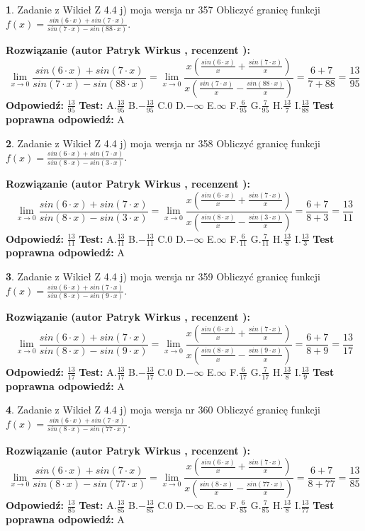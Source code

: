 \documentclass[12pt, a4paper]{article}
\theoremstyle{definition} %
\newtheorem{zad}{}
\newcommand{\zadStart}[1]{\begin{zad}#1\newline}
\newcommand{\zadStop}{\end{zad}}
\newcommand{\rozwStart}[2]{\noindent \textbf{Rozwiązanie (autor #1 , recenzent #2): }\newline}
\newcommand{\rozwStop}{\newline}
\newcommand{\odpStart}{\noindent \textbf{Odpowiedź:}\newline}
\newcommand{\odpStop}{\newline}
\newcommand{\testStart}{\noindent \textbf{Test:}\newline}
\newcommand{\testStop}{\newline}
\newcommand{\kluczStart}{\noindent \textbf{Test poprawna odpowiedź:}\newline}
\newcommand{\kluczStop}{\newline}
\begin{document}
\zadStart{Zadanie z Wikieł Z 4.4 j) moja wersja nr 357}
Obliczyć granicę funkcji $f(x)=\frac{sin(6\cdot x) +sin(7\cdot x)}{sin(7\cdot x) -sin(88\cdot x)}$.
\zadStop
\rozwStart{Patryk Wirkus}{}
$$\lim\limits_{x\to 0}\frac{sin(6\cdot x) +sin(7\cdot x)}{sin(7\cdot x) -sin(88\cdot x)}=\lim\limits_{x\to 0}\frac{x(\frac{sin(6\cdot x)}{x}+\frac{sin(7\cdot x)}{x})}{x(\frac{sin(7\cdot x)}{x}-\frac{sin(88\cdot x)}{x})}=\frac{6+7}{7+88} = \frac{13}{95}$$
\rozwStop
\odpStart
$\frac{13}{95}$
\odpStop
\testStart
A.$\frac{13}{95}$
B.$-\frac{13}{95}$
C.$0$
D.$-\infty$
E.$\infty$
F.$\frac{6}{95}$
G.$\frac{7}{95}$
H.$\frac{13}{7}$
I.$\frac{13}{88}$
\testStop
\kluczStart
A
\kluczStop



\zadStart{Zadanie z Wikieł Z 4.4 j) moja wersja nr 358}
Obliczyć granicę funkcji $f(x)=\frac{sin(6\cdot x) +sin(7\cdot x)}{sin(8\cdot x) -sin(3\cdot x)}$.
\zadStop
\rozwStart{Patryk Wirkus}{}
$$\lim\limits_{x\to 0}\frac{sin(6\cdot x) +sin(7\cdot x)}{sin(8\cdot x) -sin(3\cdot x)}=\lim\limits_{x\to 0}\frac{x(\frac{sin(6\cdot x)}{x}+\frac{sin(7\cdot x)}{x})}{x(\frac{sin(8\cdot x)}{x}-\frac{sin(3\cdot x)}{x})}=\frac{6+7}{8+3} = \frac{13}{11}$$
\rozwStop
\odpStart
$\frac{13}{11}$
\odpStop
\testStart
A.$\frac{13}{11}$
B.$-\frac{13}{11}$
C.$0$
D.$-\infty$
E.$\infty$
F.$\frac{6}{11}$
G.$\frac{7}{11}$
H.$\frac{13}{8}$
I.$\frac{13}{3}$
\testStop
\kluczStart
A
\kluczStop



\zadStart{Zadanie z Wikieł Z 4.4 j) moja wersja nr 359}
Obliczyć granicę funkcji $f(x)=\frac{sin(6\cdot x) +sin(7\cdot x)}{sin(8\cdot x) -sin(9\cdot x)}$.
\zadStop
\rozwStart{Patryk Wirkus}{}
$$\lim\limits_{x\to 0}\frac{sin(6\cdot x) +sin(7\cdot x)}{sin(8\cdot x) -sin(9\cdot x)}=\lim\limits_{x\to 0}\frac{x(\frac{sin(6\cdot x)}{x}+\frac{sin(7\cdot x)}{x})}{x(\frac{sin(8\cdot x)}{x}-\frac{sin(9\cdot x)}{x})}=\frac{6+7}{8+9} = \frac{13}{17}$$
\rozwStop
\odpStart
$\frac{13}{17}$
\odpStop
\testStart
A.$\frac{13}{17}$
B.$-\frac{13}{17}$
C.$0$
D.$-\infty$
E.$\infty$
F.$\frac{6}{17}$
G.$\frac{7}{17}$
H.$\frac{13}{8}$
I.$\frac{13}{9}$
\testStop
\kluczStart
A
\kluczStop



\zadStart{Zadanie z Wikieł Z 4.4 j) moja wersja nr 360}
Obliczyć granicę funkcji $f(x)=\frac{sin(6\cdot x) +sin(7\cdot x)}{sin(8\cdot x) -sin(77\cdot x)}$.
\zadStop
\rozwStart{Patryk Wirkus}{}
$$\lim\limits_{x\to 0}\frac{sin(6\cdot x) +sin(7\cdot x)}{sin(8\cdot x) -sin(77\cdot x)}=\lim\limits_{x\to 0}\frac{x(\frac{sin(6\cdot x)}{x}+\frac{sin(7\cdot x)}{x})}{x(\frac{sin(8\cdot x)}{x}-\frac{sin(77\cdot x)}{x})}=\frac{6+7}{8+77} = \frac{13}{85}$$
\rozwStop
\odpStart
$\frac{13}{85}$
\odpStop
\testStart
A.$\frac{13}{85}$
B.$-\frac{13}{85}$
C.$0$
D.$-\infty$
E.$\infty$
F.$\frac{6}{85}$
G.$\frac{7}{85}$
H.$\frac{13}{8}$
I.$\frac{13}{77}$
\testStop
\kluczStart
A
\kluczStop
\end{document}
